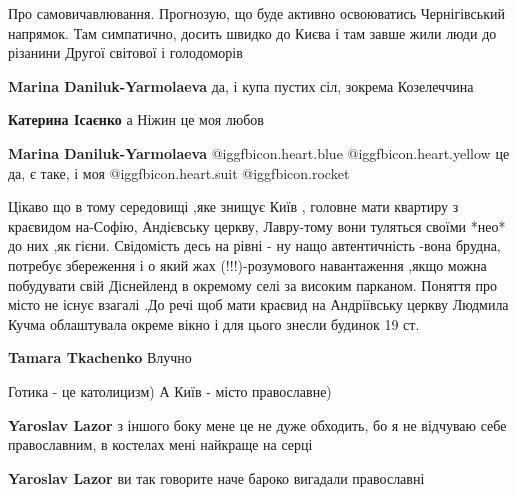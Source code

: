 \begin{itemize}
 

Про самовичавлювання. Прогнозую, що буде активно освоюватись Чернігівський
напрямок. Там симпатично, досить швидко до Києва і там завше жили люди до
різанини Другої світової і голодоморів

\begin{itemize} %
 
\textbf{Marina Daniluk-Yarmolaeva} да, і купа пустих сіл, зокрема Козелеччина

 
\textbf{Катерина Ісаєнко} а Ніжин це моя любов

 
\textbf{Marina Daniluk-Yarmolaeva}  @igg{fbicon.heart.blue}
@igg{fbicon.heart.yellow} це да, є таке, і моя @igg{fbicon.heart.suit}
@igg{fbicon.rocket} 
\end{itemize} %


Цікаво що в тому середовищі ,яке знищує Київ , головне мати квартиру з
краєвидом на-Софію, Андієвську церкву, Лавру-тому вони туляться своїми *нео* до
них ,як гієни. Свідомість десь на рівні - ну нащо автентичність -вона брудна,
потребує збереження і о який жах (!!!)-розумового навантаження ,якщо можна
побудувати свій Діснейленд в окремому селі за високим парканом. Поняття про
місто не існує взагалі .До речі щоб мати краєвид на Андріївську церкву Людмила
Кучма облаштувала окреме вікно і для цього знесли будинок 19 ст.

\begin{itemize} %
\textbf{Tamara Tkachenko} Влучно
\end{itemize} %

Готика - це католицизм)
А Київ - місто православне)

\begin{itemize} %
\textbf{Yaroslav Lazor} з іншого боку мене це не дуже обходить, бо я не відчуваю себе православним, в костелах мені найкраще на серці


\textbf{Yaroslav Lazor} ви так говорите наче бароко вигадали православні



\end{itemize}
\end{itemize}
